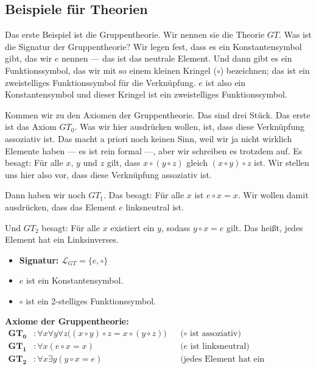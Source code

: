 \subsection{Beispiele für Theorien}

\begin{spoken-clean}[01:21:42 - 01:25:47]
Das erste Beispiel ist die Gruppentheorie. Wir nennen sie die Theorie $GT$. Was ist die Signatur der Gruppentheorie? Wir legen fest, dass es ein Konstantensymbol gibt, das wir $e$ nennen --- das ist das neutrale Element. Und dann gibt es ein Funktionssymbol, das wir mit so einem kleinen Kringel ($\circ$) bezeichnen; das ist ein zweistelliges Funktionssymbol für die Verknüpfung. $e$ ist also ein Konstantensymbol und dieser Kringel ist ein zweistelliges Funktionssymbol.

Kommen wir zu den Axiomen der Gruppentheorie. Das sind drei Stück. Das erste ist das Axiom $GT_0$. Was wir hier ausdrücken wollen, ist, dass diese Verknüpfung assoziativ ist. Das macht a priori noch keinen Sinn, weil wir ja nicht wirklich Elemente haben --- es ist rein formal ---, aber wir schreiben es trotzdem auf. Es besagt: Für alle $x$, $y$ und $z$ gilt, dass $x \circ (y \circ z)$ gleich $(x \circ y) \circ z$ ist. Wir stellen uns hier also vor, dass diese Verknüpfung assoziativ ist.

Dann haben wir noch $GT_1$. Das besagt: Für alle $x$ ist $e \circ x = x$. Wir wollen damit ausdrücken, dass das Element $e$ linksneutral ist.

Und $GT_2$ besagt: Für alle $x$ existiert ein $y$, sodass $y \circ x = e$ gilt. Das heißt, jedes Element hat ein Linksinverses.
\end{spoken-clean}

\begin{math-stroke}
\begin{itemize}
    \item \textbf{Signatur:} $\mathcal{L}_{GT} = \{e, \circ\}$
    \item $e$ ist ein Konstantensymbol.
    \item $\circ$ ist ein 2-stelliges Funktionssymbol.
\end{itemize}

\textbf{Axiome der Gruppentheorie:}
\begin{align*}
    \mathbf{GT_0} &\colon \forall x \forall y \forall z \bigl((x \circ y) \circ z = x \circ (y \circ z)\bigr) && \text{($\circ$ ist assoziativ)} \\
    \mathbf{GT_1} &\colon \forall x (e \circ x = x) && \text{($e$ ist linksneutral)} \\
    \mathbf{GT_2} &\colon \forall x \exists y (y \circ x = e) && \text{(jedes Element hat ein Linksinverses)}
\end{align*}
\end{math-stroke}

